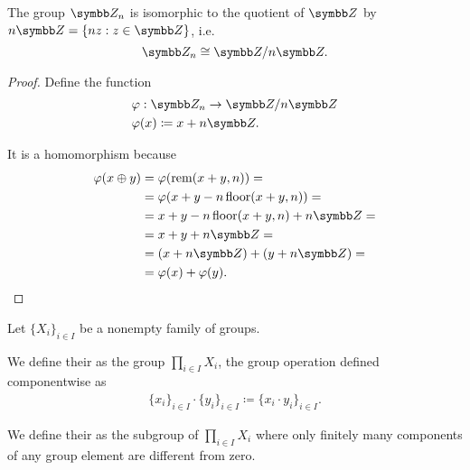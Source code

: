 \begin{proposition}\label{thm:integers_modulo_isomorphic_to_quotient_group}
  The group \( \Z_n \) is isomorphic to the quotient of \( \Z \) by \( n\Z = \{ nz : z \in \Z \} \), i.e.
  \begin{equation*}
    \Z_n \cong \Z / n\Z.
  \end{equation*}
\end{proposition}
\begin{proof}
  Define the function
  \begin{align*}
    &\varphi: \Z_n \to \Z / n\Z \\
    &\varphi(x) \coloneqq x + n\Z.
  \end{align*}

  It is a homomorphism because
  \begin{align*}
    \varphi(x \oplus y)
    &=
    \varphi(\Rem(x + y, n))
    = \\ &=
    \varphi(x + y - n \Floor(x + y, n))
    = \\ &=
    x + y - n \Floor(x + y, n) + n\Z
    = \\ &=
    x + y + n\Z
    = \\ &=
    (x + n\Z) + (y + n\Z)
    = \\ &=
    \varphi(x) + \varphi(y).
  \end{align*}
\end{proof}

\begin{definition}\label{def:group_direct_product}
  Let \( \{ X_i \}_{i \in I} \) be a nonempty family of groups.

  We define their  as the group \( \prod_{i \in I} X_i \), the group operation defined componentwise as
  \begin{align*}
    \{ x_i \}_{i \in I} \cdot \{ y_i \}_{i \in I}
    \coloneqq
    \{ x_i \cdot y_i \}_{i \in I}.
  \end{align*}

  We define their  as the subgroup of \( \prod_{i \in I} X_i \) where only finitely many components of any group element are different from zero.
\end{definition}

